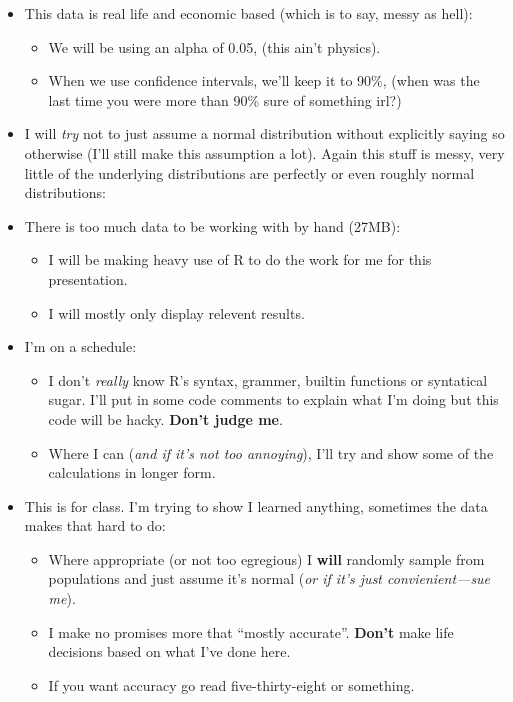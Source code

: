 \documentclass[11pt]{article}
\providecommand{\tightlist}{%
      \setlength{\itemsep}{0pt}\setlength{\parskip}{0pt}}
\begin{document}
\begin{itemize}
\item
  This data is real life and economic based (which is to say, messy as
  hell):

  \begin{itemize}
  \tightlist
  \item
    We will be using an alpha of 0.05, (this ain't physics).
  \item
    When we use confidence intervals, we'll keep it to 90\%, (when was
    the last time you were more than 90\% sure of something irl?)
  \end{itemize}
\item
  I will \emph{try} not to just assume a normal distribution without
  explicitly saying so otherwise (I'll still make this assumption a
  lot). Again this stuff is messy, very little of the underlying
  distributions are perfectly or even roughly normal distributions:
\item
  There is too much data to be working with by hand (27MB):

  \begin{itemize}
  \tightlist
  \item
    I will be making heavy use of R to do the work for me for this
    presentation.
  \item
    I will mostly only display relevent results.
  \end{itemize}
\item
  I'm on a schedule:

  \begin{itemize}
  \tightlist
  \item
    I don't \emph{really} know R's syntax, grammer, builtin functions or
    syntatical sugar. I'll put in some code comments to explain what I'm
    doing but this code will be hacky. \textbf{Don't judge me}.
  \item
    Where I can (\emph{and if it's not too annoying}), I'll try and show
    some of the calculations in longer form.
  \end{itemize}
\item
  This is for class. I'm trying to show I learned anything, sometimes
  the data makes that hard to do:

  \begin{itemize}
  \tightlist
  \item
    Where appropriate (or not too egregious) I \textbf{will} randomly
    sample from populations and just assume it's normal (\emph{or if
    it's just convienient---sue me}).
  \item
    I make no promises more that ``mostly accurate''. \textbf{Don't}
    make life decisions based on what I've done here.
  \item
    If you want accuracy go read five-thirty-eight or something.
  \end{itemize}
\end{itemize}
\end{document}
